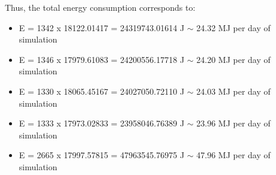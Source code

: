 Thus, the total energy consumption corresponds to: 
\begin{itemize}
\item E = 1342 x 18122.01417 = 24319743.01614 J $\sim$ 24.32 MJ per day of simulation
\item E = 1346 x 17979.61083 = 24200556.17718 J $\sim$ 24.20 MJ per day of simulation
\item E = 1330 x 18065.45167 = 24027050.72110 J $\sim$ 24.03 MJ per day of simulation
\item E = 1333 x 17973.02833 = 23958046.76389 J $\sim$ 23.96 MJ per day of simulation
\item E = 2665 x 17997.57815 = 47963545.76975 J $\sim$ 47.96 MJ per day of simulation
\end{itemize}
